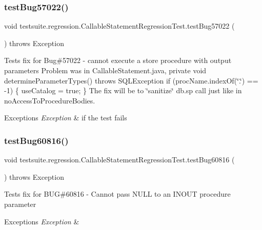 \subsubsection{\texorpdfstring{test\+Bug57022()}{testBug57022()}}
{\footnotesize\ttfamily void testsuite.\+regression.\+Callable\+Statement\+Regression\+Test.\+test\+Bug57022 (\begin{DoxyParamCaption}{ }\end{DoxyParamCaption}) throws Exception}

Tests fix for Bug\#57022 -\/ cannot execute a store procedure with output parameters Problem was in Callable\+Statement.\+java, private void determine\+Parameter\+Types() throws S\+Q\+L\+Exception if (proc\+Name.\+index\+Of(\char`\"{}.\char`\"{}) == -\/1) \{ use\+Catalog = true; \} The fix will be to \char`\"{}sanitize\char`\"{} db.\+sp call just like in no\+Access\+To\+Procedure\+Bodies.


\begin{DoxyExceptions}{Exceptions}
{\em Exception} & if the test fails \\
\hline
\end{DoxyExceptions}
\mbox{\label{classtestsuite_1_1regression_1_1_callable_statement_regression_test_adf4d392882f055ca081e7af6441af0e5}} 
\subsubsection{\texorpdfstring{test\+Bug60816()}{testBug60816()}}
{\footnotesize\ttfamily void testsuite.\+regression.\+Callable\+Statement\+Regression\+Test.\+test\+Bug60816 (\begin{DoxyParamCaption}{ }\end{DoxyParamCaption}) throws Exception}

Tests fix for B\+UG\#60816 -\/ Cannot pass N\+U\+LL to an I\+N\+O\+UT procedure parameter


\begin{DoxyExceptions}{Exceptions}
{\em Exception} & \\
\hline
\end{DoxyExceptions}
\mbox{\label{classtestsuite_1_1regression_1_1_callable_statement_regression_test_a7bf5345327e03c1c948299a62ca552c7}} 
